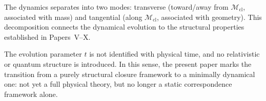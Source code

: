 \documentclass[12pt]{article}
\newcommand{\Mcl}{\mathcal{M}_{\mathrm{cl}}}
\begin{document}
The dynamics separates into two modes: transverse (toward/away from $\Mcl$, associated with mass) and tangential (along $\Mcl$, associated with geometry). This decomposition connects the dynamical evolution to the structural properties established in Papers~V--X.

The evolution parameter $t$ is not identified with physical time, and no relativistic or quantum structure is introduced. In this sense, the present paper marks the transition from a purely structural closure framework to a minimally dynamical one: not yet a full physical theory, but no longer a static correspondence framework alone.



\end{document}
